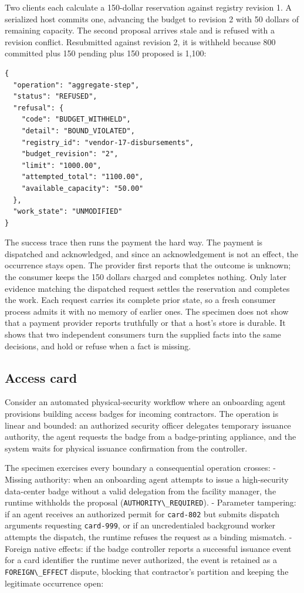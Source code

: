 \documentclass[
  american,
  11pt,
  letterpaper,
]{article}
\newcommand{\passthrough}[1]{#1}
\begin{document}
Two clients each calculate a 150-dollar reservation against registry
revision 1. A serialized host commits one, advancing the budget to
revision 2 with 50 dollars of remaining capacity. The second proposal
arrives stale and is refused with a revision conflict. Resubmitted
against revision 2, it is withheld because 800 committed plus 150
pending plus 150 proposed is 1,100:

\begin{lstlisting}
{
  "operation": "aggregate-step",
  "status": "REFUSED",
  "refusal": {
    "code": "BUDGET_WITHHELD",
    "detail": "BOUND_VIOLATED",
    "registry_id": "vendor-17-disbursements",
    "budget_revision": "2",
    "limit": "1000.00",
    "attempted_total": "1100.00",
    "available_capacity": "50.00"
  },
  "work_state": "UNMODIFIED"
}
\end{lstlisting}

The success trace then runs the payment the hard way. The payment is
dispatched and acknowledged, and since an acknowledgement is not an
effect, the occurrence stays open. The provider first reports that the
outcome is unknown; the consumer keeps the 150 dollars charged and
completes nothing. Only later evidence matching the dispatched request
settles the reservation and completes the work. Each request carries its
complete prior state, so a fresh consumer process admits it with no
memory of earlier ones. The specimen does not show that a payment
provider reports truthfully or that a host's store is durable. It shows
that two independent consumers turn the supplied facts into the same
decisions, and hold or refuse when a fact is missing.

\subsection{Access card}\label{access-card}

Consider an automated physical-security workflow where an onboarding
agent provisions building access badges for incoming contractors. The
operation is linear and bounded: an authorized security officer
delegates temporary issuance authority, the agent requests the badge
from a badge-printing appliance, and the system waits for physical
issuance confirmation from the controller.

The specimen exercises every boundary a consequential operation crosses:
- Missing authority: when an onboarding agent attempts to issue a
high-security data-center badge without a valid delegation from the
facility manager, the runtime withholds the proposal
(\passthrough{\lstinline!AUTHORITY\_REQUIRED!}). - Parameter tampering:
if an agent receives an authorized permit for
\passthrough{\lstinline!card-802!} but submits dispatch arguments
requesting \passthrough{\lstinline!card-999!}, or if an uncredentialed
background worker attempts the dispatch, the runtime refuses the request
as a binding mismatch. - Foreign native effects: if the badge controller
reports a successful issuance event for a card identifier the runtime
never authorized, the event is retained as a
\passthrough{\lstinline!FOREIGN\_EFFECT!} dispute, blocking that
contractor's partition and keeping the legitimate occurrence open:
\end{document}
